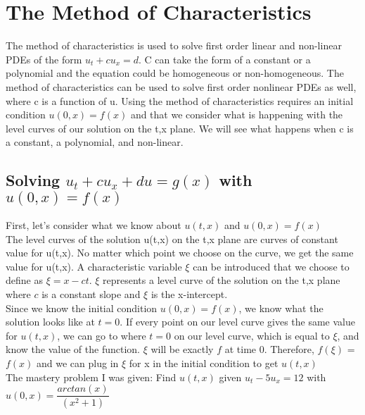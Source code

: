 \documentclass{article}
\newcommand{\red}[1]{\textcolor{red}{#1}}
\newcommand{\blue}[1]{\textcolor{blue}{#1}}
\begin{document}
    
\section{The Method of Characteristics}
The method of characteristics is used to solve first order linear and non-linear PDEs of the form $u_t+cu_x = d$.
C can take the form of a constant or a polynomial and the equation could be homogeneous or non-homogeneous. The method of characteristics can be used to solve first order nonlinear PDEs as well, where c is a function of u. Using the method of characteristics requires an initial condition $u(0,x)=f(x)$ and that we consider what is happening with the level curves of our solution on the t,x plane. We will see what happens when c is a constant, a polynomial, and non-linear. 

\subsection{Solving $u_t+cu_x +du = g(x)$ with $u(0,x)=f(x)$}

First, let's consider what we know about $u(t,x)$ and $u(0,x)=f(x)$ \\

The level curves of the solution u(t,x) on the t,x plane are curves of constant value for u(t,x). No matter which point we choose on the curve, we get the same value for u(t,x). A characteristic variable $\xi$ can be introduced that we choose to define as $\xi = x-ct$. $\xi$ represents a level curve of the solution on the t,x plane where $c$ is a constant slope and $\xi$ is the x-intercept.\\

Since we know the initial condition $u(0,x) = f(x)$, we know what the solution looks like at $t=0$. If every point on our level curve gives the same value for $u(t,x)$, we can go to where $t=0$ on our level curve, which is equal to $\xi$, and know the value of the function. $\xi$ will be exactly $f$ at time 0. Therefore, $f(\xi)$ = $f(x)$ and we can plug in $\xi$ for x in the initial condition to get $u(t,x)$ \\

The mastery problem I was given: Find $u(t,x)$ given $u_t-5u_x=12$ with $u(0,x) = \dfrac{arctan(x)}{(x^2+1)}$ \\
\end{document}
